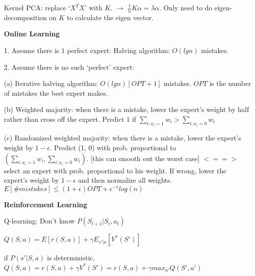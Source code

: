 \documentclass{article}
\begin{document}
Kernel PCA: replace `$X^{T}X$' with $K$. $\rightarrow$ $\frac{1}{n}K\alpha = \lambda \alpha$. Only need to do eigen-decomposition on $K$ to calculate the eigen vector.

\noindent
\textbf{Online Learning}

1. Assume there is $1$ perfect expert: Halving algorithm: $O(lgn)$ mistakes.

2. Assume there is no such `perfect' expert: 

(a) Iterative halving algorithm: $O(lgn)[OPT+1]$ mistakes. $OPT$ is the number of mistakes the best expert makes.

(b) Weighted majority: when there is a mistake, lower the expert's weight by half rather than cross off the expert. Predict 1 if $\sum_{i:x_i=1} w_i > \sum_{i:x_i=0} w_i$

(c) Randomized weighted majority: when there is a mistake, lower the expert's weight by $1-\epsilon$. Predict (1, 0) with prob. proportional to $(\sum_{i:x_i=1} w_i, \sum_{i:x_i=0} w_i)$. [this can smooth out the worst case] $<==>$ select an expert with prob. proportional to his weight. If wrong, lower the expert's weight by $1-\epsilon$ and then normalize all weights. $E[\#mistakes] \leq (1+\epsilon)OPT + \epsilon^{-1}log(n)$

\noindent
\textbf{Reinforcement Learning}

Q-learning: Don't know $P(S_{t+1} | S_t, a_t)$ 

$Q(S,a) = E[r(S,a)] + \gamma E_{s'|a}[V^{*}(S')]$

if $P(s'|S,a)$ is deterministic, $Q(S,a) = r(S,a) + \gamma V^{*}(S') = r(S,a) + \gamma max_{a'} Q(S', a')$
\end{document}

